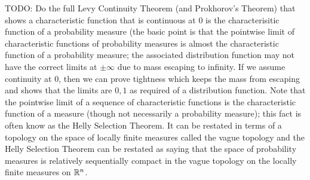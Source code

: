 TODO: Do the full Levy Continuity Theorem (and Prokhorov's Theorem) that shows a characteristic
function that is continuous at $0$ is the characterisitic function of
a probability measure (the basic point is that the pointwise limit of
characteristic functions of probability measures is almost the
characteristic function of a probability measure; the associated
distribution function may not have the correct limits at $\pm
\infty$ due to mass escaping to infinity.  If we assume continuity at $0$, then we can prove tightness
which keeps the mass from escaping and shows that the limits are $0,1$ as required of a distribution
function.  Note that the pointwise limit of a sequence of
characteristic functions is the characteristic function of a measure
(though not necessarily a probability measure); this fact is often
know as the Helly Selection Theorem.  It can be restated in terms of a
topology on the space of locally finite measures called the vague
topology and the Helly Selection Theorem can be restated as saying
that the space of probability measures is relatively sequentially
compact in the vague topology on the locally finite measures on $\mathbb{R}^n$.

